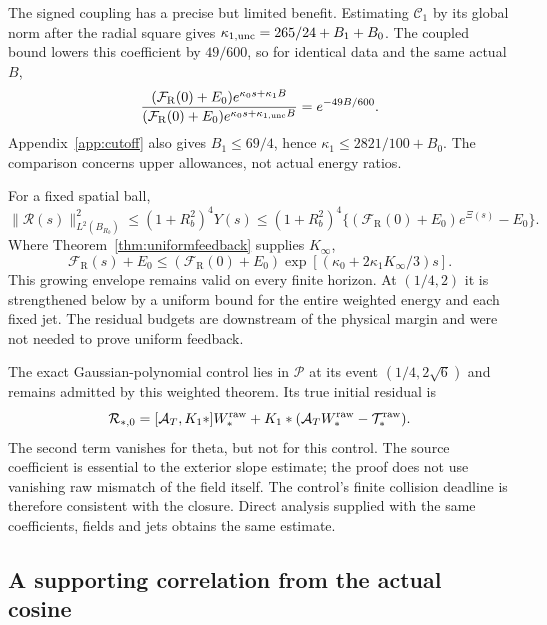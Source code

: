 \documentclass[11pt]{article}
\numberwithin{equation}{section}
\begin{document}
The signed coupling has a precise but limited benefit. Estimating
$\mathscr C_1$ by its global norm after the radial square gives
$\kappa_{1,\rm unc}=265/24+B_1+B_0$. The coupled bound lowers this
coefficient by $49/600$, so for identical data and the same actual $B$,
\begin{equation}\label{eq:sourceallowancecomparison}
 \frac{(\mathcal F_{\mathrm R}(0)+E_0)e^{\kappa_0s+\kappa_1B}}
      {(\mathcal F_{\mathrm R}(0)+E_0)e^{\kappa_0s+\kappa_{1,\rm unc}B}}
 =e^{-49B/600}.
\end{equation}
Appendix~\ref{app:cutoff} also gives $B_1\le69/4$, hence
$\kappa_1\le2821/100+B_0$. The comparison concerns upper allowances,
not actual energy ratios.

For a fixed spatial ball,
\begin{equation}\label{eq:weightedlocalresidual}
 \|\mathcal R(s)\|_{L^2(B_{R_b})}^2
 \le(1+R_b^2)^4Y(s)
 \le(1+R_b^2)^4\{(\mathcal F_{\mathrm R}(0)+E_0)e^{\Xi(s)}-E_0\}.
\end{equation}
Where Theorem~\ref{thm:uniformfeedback} supplies $K_\infty$,
\begin{equation}\label{eq:residualfinitehorizon}
 \mathcal F_{\mathrm R}(s)+E_0
 \le(\mathcal F_{\mathrm R}(0)+E_0)
          \exp[(\kappa_0+2\kappa_1K_\infty/3)s].
\end{equation}
This growing envelope remains valid on every finite horizon.
At $(1/4,2)$ it is strengthened below by a uniform bound for the entire
weighted energy and each fixed jet. The residual budgets are downstream
of the physical margin and were not needed to prove uniform feedback.

The exact Gaussian-polynomial control lies in $\mathscr P$ at its
event $(1/4,2\sqrt6)$ and remains admitted by this weighted theorem.
Its true initial residual is
\begin{equation}\label{eq:weightedcontrolresidual}
 \mathcal R_{*,0}=[\mathcal A_T,K_1*]W_*^{\rm raw}
       +K_1*(\mathcal A_TW_*^{\rm raw}-\mathcal T_*^{\rm raw}).
\end{equation}
The second term vanishes for theta, but not for this control.
The source coefficient is essential to the exterior slope estimate;
the proof does not use vanishing raw mismatch of the field itself.
The control's finite collision deadline is therefore consistent with
the closure. Direct analysis supplied with the same coefficients,
fields and jets obtains the same estimate.

\subsection{A supporting correlation from the actual cosine}
\end{document}
